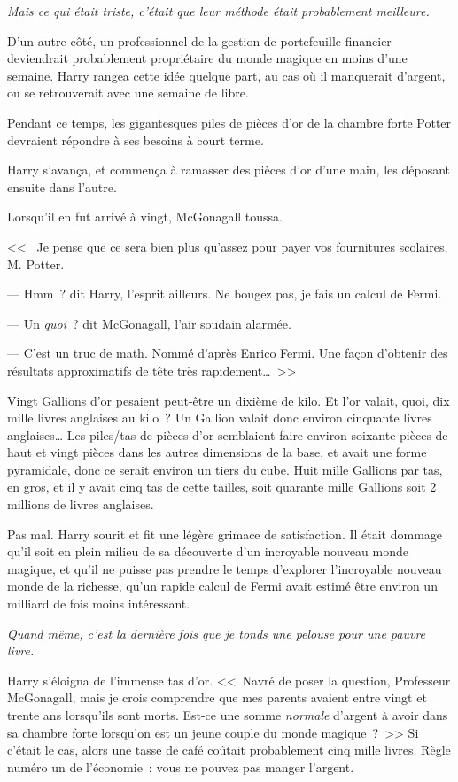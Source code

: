 \emph{Mais ce qui était triste, c'était que leur méthode était probablement meilleure.}

D'un autre côté, un professionnel de la gestion de portefeuille financier deviendrait probablement propriétaire du monde magique en moins d'une semaine. Harry rangea cette idée quelque part, au cas où il manquerait d'argent, ou se retrouverait avec une semaine de libre.

Pendant ce temps, les gigantesques piles de pièces d'or de la chambre forte Potter devraient répondre à ses besoins à court terme.

Harry s'avança, et commença à ramasser des pièces d'or d'une main, les déposant ensuite dans l'autre.

Lorsqu'il en fut arrivé à vingt, McGonagall toussa.

<<~ Je pense que ce sera bien plus qu'assez pour payer vos fournitures scolaires, M. Potter.

--- Hmm~? dit Harry, l'esprit ailleurs. Ne bougez pas, je fais un calcul de Fermi.

--- Un \emph{quoi}~? dit McGonagall, l'air soudain alarmée.

--- C'est un truc de math. Nommé d'après Enrico Fermi. Une façon d'obtenir des résultats approximatifs de tête très rapidement…~>>

Vingt Gallions d'or pesaient peut-être un dixième de kilo. Et l'or valait, quoi, dix mille livres anglaises au kilo~? Un Gallion valait donc environ cinquante livres anglaises… Les piles/tas de pièces d'or semblaient faire environ soixante pièces de haut et vingt pièces dans les autres dimensions de la base, et avait une forme pyramidale, donc ce serait environ un tiers du cube. Huit mille Gallions par tas, en gros, et il y avait cinq tas de cette tailles, soit quarante mille Gallions soit 2 millions de livres anglaises.

Pas mal. Harry sourit et fit une légère grimace de satisfaction. Il était dommage qu'il soit en plein milieu de sa découverte d'un incroyable nouveau monde magique, et qu'il ne puisse pas prendre le temps d'explorer l'incroyable nouveau monde de la richesse, qu'un rapide calcul de Fermi avait estimé être environ un milliard de fois moins intéressant.

\emph{Quand même, c'est la dernière fois que je tonds une pelouse pour une pauvre livre.}

Harry s'éloigna de l'immense tas d'or. <<~Navré de poser la question, Professeur McGonagall, mais je crois comprendre que mes parents avaient entre vingt et trente ans lorsqu'ils sont morts. Est-ce une somme \emph{normale} d'argent à avoir dans sa chambre forte lorsqu'on est un jeune couple du monde magique~?~>> Si c'était le cas, alors une tasse de café coûtait probablement cinq mille livres. Règle numéro un de l'économie~: vous ne pouvez pas manger l'argent.


